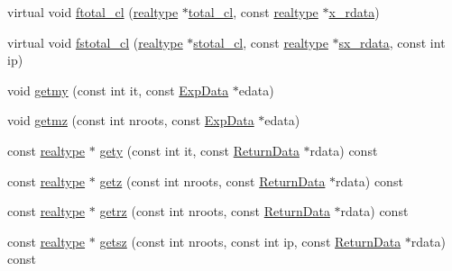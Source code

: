 \begin{DoxyCompactItemize}
\item 
virtual void \mbox{\hyperlink{classamici_1_1_model_ab7c357d92ab37cfe9728a31e4232cfe9}{ftotal\+\_\+cl}} (\mbox{\hyperlink{namespaceamici_a1bdce28051d6a53868f7ccbf5f2c14a3}{realtype}} $\ast$\mbox{\hyperlink{classamici_1_1_model_a20f20480665b3eea684392186fb87675}{total\+\_\+cl}}, const \mbox{\hyperlink{namespaceamici_a1bdce28051d6a53868f7ccbf5f2c14a3}{realtype}} $\ast$\mbox{\hyperlink{classamici_1_1_model_a297a15f378087de3c782f5af7f29510b}{x\+\_\+rdata}})
\item 
virtual void \mbox{\hyperlink{classamici_1_1_model_a6fe0e8c26a7c1f72e3afd0f1322b3416}{fstotal\+\_\+cl}} (\mbox{\hyperlink{namespaceamici_a1bdce28051d6a53868f7ccbf5f2c14a3}{realtype}} $\ast$\mbox{\hyperlink{classamici_1_1_model_a103e2e2161a296524543b0bd060fc22a}{stotal\+\_\+cl}}, const \mbox{\hyperlink{namespaceamici_a1bdce28051d6a53868f7ccbf5f2c14a3}{realtype}} $\ast$\mbox{\hyperlink{classamici_1_1_model_a61ffc2a1fd9c46b5869ab4321e70d791}{sx\+\_\+rdata}}, const int ip)
\item 
void \mbox{\hyperlink{classamici_1_1_model_aa01d5361cf972cce5eaddca05985f745}{getmy}} (const int it, const \mbox{\hyperlink{classamici_1_1_exp_data}{Exp\+Data}} $\ast$edata)
\item 
void \mbox{\hyperlink{classamici_1_1_model_a523a7d80e06bfab324d566dd6032abcf}{getmz}} (const int nroots, const \mbox{\hyperlink{classamici_1_1_exp_data}{Exp\+Data}} $\ast$edata)
\item 
const \mbox{\hyperlink{namespaceamici_a1bdce28051d6a53868f7ccbf5f2c14a3}{realtype}} $\ast$ \mbox{\hyperlink{classamici_1_1_model_aee6c7b534a091180c01aabb3be44a216}{gety}} (const int it, const \mbox{\hyperlink{classamici_1_1_return_data}{Return\+Data}} $\ast$rdata) const
\item 
const \mbox{\hyperlink{namespaceamici_a1bdce28051d6a53868f7ccbf5f2c14a3}{realtype}} $\ast$ \mbox{\hyperlink{classamici_1_1_model_a30571e418f94ca61b8df2b355e46ee1a}{getz}} (const int nroots, const \mbox{\hyperlink{classamici_1_1_return_data}{Return\+Data}} $\ast$rdata) const
\item 
const \mbox{\hyperlink{namespaceamici_a1bdce28051d6a53868f7ccbf5f2c14a3}{realtype}} $\ast$ \mbox{\hyperlink{classamici_1_1_model_ab2a9be3bb641741a52ddc48fcd9aa143}{getrz}} (const int nroots, const \mbox{\hyperlink{classamici_1_1_return_data}{Return\+Data}} $\ast$rdata) const
\item 
const \mbox{\hyperlink{namespaceamici_a1bdce28051d6a53868f7ccbf5f2c14a3}{realtype}} $\ast$ \mbox{\hyperlink{classamici_1_1_model_a78863f621eda7016ab7136a357dacdaf}{getsz}} (const int nroots, const int ip, const \mbox{\hyperlink{classamici_1_1_return_data}{Return\+Data}} $\ast$rdata) const

\end{DoxyCompactItemize}
